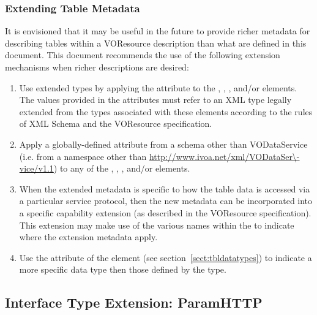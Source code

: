 \documentclass[11pt,a4paper]{ivoa}
\begin{document}
\subsubsection{Extending Table Metadata}
\label{sect:tblext}

It is envisioned that it may be useful in the future to provide richer
metadata for describing tables within a VOResource description than
what are defined in this document.  This document recommends the
use of the following extension mechanisms when richer descriptions are
desired:

\begin{enumerate}
\item Use extended types by applying the 
       attribute to the ,
       , ,
        and/or
        elements.  The values provided in the
       attributes must refer to an XML type legally extended from the types
       associated with these elements according to the rules of XML Schema
       \citep{std:XSD} and the VOResource specification.

\item Apply a globally-defined attribute from a schema other than
       VODataService (i.e. from a namespace other than
       \url{http://www.ivoa.net/xml/VODataSer\-vice/v1.1}) to any of the
       , ,
       , and/or 
       elements.

\item When the extended metadata is specific to how the table data is
       accessed via a particular service protocol, then the new
       metadata can be incorporated into a specific capability
       extension (as described in the VOResource specification).
       This extension may make use of the
       various names within the  to
       indicate where the extension metadata apply.

\item Use the  attribute of the
        element (see
       section~\ref{sect:tbldatatypes})
       to indicate a more specific data type then those defined by the
        type.
\end{enumerate}

\subsection{Interface Type Extension: ParamHTTP}
\label{sect:paramif}
\end{document}
